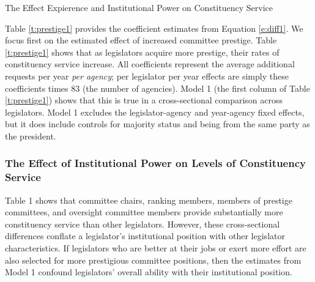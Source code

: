\documentclass[12pt]{article}
\begin{document}
\begin{table}[hbt!]
\caption{The Effect Expierence and Institutional Power on Constituency Service} \label{t:prestige1}

\begin{minipage}{\textwidth}
\begin{center}

\end{center}
\end{minipage}
\end{table}

Table \ref{t:prestige1} provides the coefficient estimates from Equation \ref{e:diff1}. We focus first on the estimated effect of increased committee prestige. Table \ref{t:prestige1} shows that as legislators acquire more prestige, their rates of constituency service increase. All coefficients represent the average additional requests per year \textit{per agency}; per legislator per year effects are simply these coefficients times 83 (the number of agencies).
Model 1 (the first column of Table \ref{t:prestige1}) shows that this is true in a cross-sectional comparison across legislators. Model 1 excludes the legislator-agency and year-agency fixed effects, but it does include controls for majority status and being from the same party as the president. 

\subsubsection{The Effect of Institutional Power on Levels of Constituency Service}\label{s:prestigeresults} 

Table 1 shows that committee chairs, ranking members, members of prestige committees, and oversight committee members provide substantially more constituency service than other legislators. However, these cross-sectional differences conflate a legislator's institutional position with other legislator characteristics. If legislators who are better at their jobs or exert more effort are also selected for more prestigious committee positions, then the estimates from Model 1 confound legislators' overall ability with their institutional position.   
\end{document}

